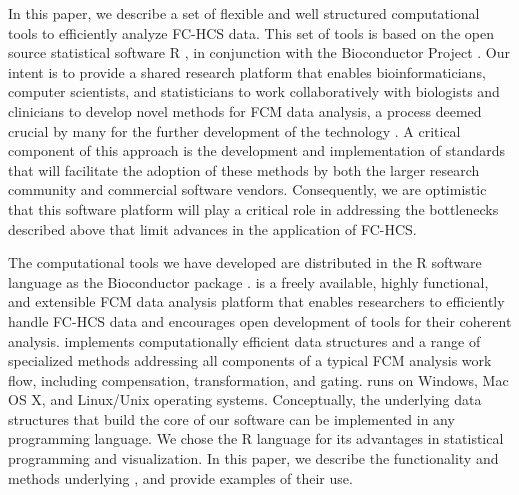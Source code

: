 \documentclass[10pt]{bmc_article}
\newenvironment{bmcformat}{\begin{raggedright}\baselineskip20pt\sloppy\setboolean{publ}{false}}{\end{raggedright}\baselineskip20pt\sloppy}
\begin{document}
\begin{bmcformat}
In this paper, we describe a set of flexible and well structured
computational tools to efficiently analyze FC-HCS data. This set of
tools is based on the open source statistical software R
\citep{Rmain}, in conjunction with the Bioconductor Project
\citep{BIOC}. Our intent is to provide a shared research platform that
enables bioinformaticians, computer scientists, and statisticians to
work collaboratively with biologists and clinicians to develop novel
methods for FCM data analysis, a process deemed crucial by many for
the further development of the technology \citep{lizard2007fca}. A
critical component of this approach is the development and
implementation of standards that will facilitate the adoption of these
methods by both the larger research community and commercial software
vendors.  Consequently, we are optimistic that this software platform
will play a critical role in addressing the bottlenecks described
above that limit advances in the application of FC-HCS.

The computational tools we have developed are distributed in the R
software language as the Bioconductor package
.  is a freely available, highly
functional, and extensible FCM data analysis platform that enables
researchers to efficiently handle FC-HCS data and encourages open
development of tools for their coherent analysis. 
implements computationally efficient data structures and a range of
specialized methods addressing all components of a typical FCM
analysis work flow, including compensation, transformation, and
gating.  runs on Windows, Mac OS X, and Linux/Unix
operating systems. Conceptually, the underlying data structures that
build the core of our software can be implemented in any programming
language. We chose the R language for its advantages in statistical
programming and visualization. In this paper, we describe the
functionality and methods underlying , and provide
examples of their use.


\end{bmcformat}
\end{document}
